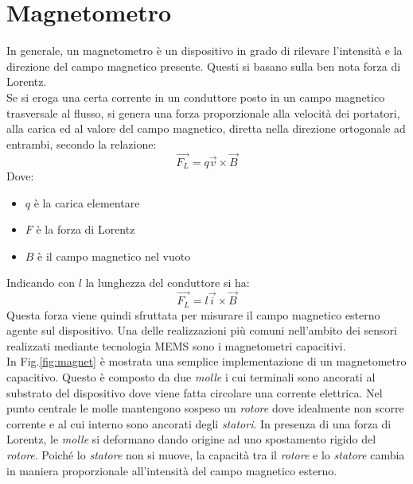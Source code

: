 \section{Magnetometro}
\label{magnetometro}
In generale, un magnetometro è un dispositivo in grado di rilevare l'intensità e la direzione del campo magnetico presente. Questi si basano sulla ben nota forza di Lorentz.\\
Se si eroga una certa corrente in un conduttore posto in un campo magnetico trasversale al flusso, si genera una forza proporzionale alla velocità dei portatori, alla carica ed al valore del campo magnetico, diretta nella direzione ortogonale ad entrambi, secondo la  relazione:
\begin{equation}
\overrightarrow{F_L} = q \overrightarrow{v} \times \overrightarrow{B}
\end{equation}
Dove:
\begin{itemize}
	\item $q$ è la carica elementare
	\item $F$ è la forza di Lorentz
	\item $B$ è il campo magnetico nel vuoto
\end{itemize}
Indicando con $l$ la lunghezza del conduttore si ha:
\begin{equation}
\overrightarrow{F_L} = l \overrightarrow{i} \times \overrightarrow{B}
\end{equation}
Questa forza viene quindi sfruttata per misurare il campo magnetico esterno agente sul dispositivo. Una delle realizzazioni più comuni nell'ambito dei sensori realizzati mediante tecnologia MEMS sono i magnetometri capacitivi.\\
In Fig.\ref{fig:magnet} è mostrata una semplice implementazione di un magnetometro capacitivo. Questo è composto da due \textit{molle} i cui terminali sono ancorati al substrato del dispositivo dove viene fatta circolare una corrente elettrica. Nel punto centrale le molle mantengono sospeso un \textit{rotore} dove idealmente non scorre corrente e al cui interno sono ancorati degli \textit{statori}. In presenza di una forza di Lorentz, le \textit{molle} si deformano dando origine ad uno spostamento rigido del \textit{rotore}. Poiché lo \textit{statore} non si muove, la capacità tra il \textit{rotore} e lo \textit{statore} cambia in maniera proporzionale all'intensità del campo magnetico esterno.
